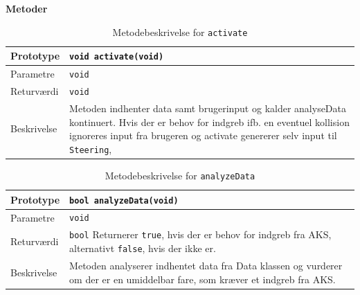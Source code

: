 \textbf{Metoder}


\begin{table}[h]
\begin{tabularx}{\textwidth}{| L{2.5 cm} | Z |} \hline
Prototype & \texttt{void activate(void)} \\\hline
Parametre & \texttt{void}  \\\hline
Returværdi &  \texttt{void} \\\hline
Beskrivelse & Metoden indhenter data samt brugerinput og kalder analyseData kontinuert. Hvis der er behov for indgreb ifb. en eventuel kollision ignoreres input fra brugeren og activate genererer selv input til \texttt{Steering}, \\\hline
\end{tabularx}
\caption{Metodebeskrivelse for \texttt{activate}}
\label{table:met_aks_activate}
\end{table}

\begin{table}[h]
\begin{tabularx}{\textwidth}{| L{2.5 cm} | Z |} \hline
Prototype & \texttt{bool analyzeData(void)} \\\hline
Parametre & \texttt{void}  \\\hline
Returværdi &  \texttt{bool} \newline
Returnerer \texttt{true}, hvis der er behov for indgreb fra AKS, alternativt \texttt{false}, hvis der ikke er. \\\hline
Beskrivelse & Metoden analyserer indhentet data fra Data klassen og vurderer om der er en umiddelbar fare, som kræver et indgreb fra AKS. \\\hline
\end{tabularx}
\caption{Metodebeskrivelse for \texttt{analyzeData}}
\label{table:met_aks_analyzeData}
\end{table}